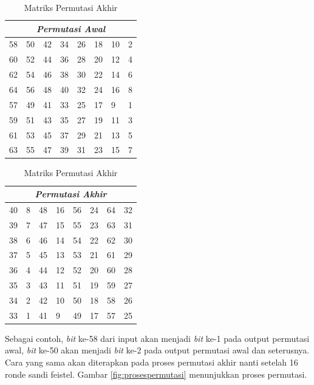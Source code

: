 \begin{table}[H]
	\centering
	\begin{minipage}[H]{.4\textwidth}
		\begin{tabular}{|l|l|l|l|l|l|l|l|}
				\hline
				\multicolumn{8}{|c|}{\textit{Permutasi Awal}} \\
				\hline
				58	&	50	&	42	&	34	&	26	&	18	&	10	&	2	\\ \hline
				60	&	52	&	44	&	36	&	28	&	20	&	12	&	4	\\ \hline
				62	&	54	&	46	&	38	&	30	&	22	&	14	&	6	\\ \hline
				64	&	56	&	48	&	40	&	32	&	24	&	16	&	8	\\ \hline
				57	&	49	&	41	&	33	&	25	&	17	&	9	&	1	\\ \hline
				59	&	51	&	43	&	35	&	27	&	19	&	11	&	3	\\ \hline
				61	&	53	&	45	&	37	&	29	&	21	&	13	&	5	\\ \hline
				63	&	55	&	47	&	39	&	31	&	23	&	15	&	7	\\ \hline
		\end{tabular}
		\caption{Matriks Permutasi Awal}\label{table:awal}
	\end{minipage}\qquad
	\begin{minipage}[H]{.4\textwidth}
		\begin{tabular}{|l|l|l|l|l|l|l|l|}
				\hline
				\multicolumn{8}{|c|}{\textit{Permutasi Akhir}} \\
				\hline
				40	&	8	&	48	&	16	&	56	&	24	&	64	&	32	\\ \hline
				39	&	7	&	47	&	15	&	55	&	23	&	63	&	31	\\ \hline
				38	&	6	&	46	&	14	&	54	&	22	&	62	&	30	\\ \hline
				37	&	5	&	45	&	13	&	53	&	21	&	61	&	29	\\ \hline
				36	&	4	&	44	&	12	&	52	&	20	&	60	&	28	\\ \hline
				35	&	3	&	43	&	11	&	51	&	19	&	59	&	27	\\ \hline
				34	&	2	&	42	&	10	&	50	&	18	&	58	&	26	\\ \hline
				33	&	1	&	41	&	9	&	49	&	17	&	57	&	25	\\ \hline
		\end{tabular}
		\caption{Matriks Permutasi Akhir}\label{table:akhir}
	\end{minipage}\hfill
\end{table}


Sebagai contoh, \textit{bit} ke-58 dari input akan menjadi \textit{bit} ke-1 pada output permutasi awal, \textit{bit} ke-50 akan menjadi \textit{bit} ke-2 pada output permutasi awal dan seterusnya. Cara yang sama akan diterapkan pada proses permutasi akhir nanti setelah 16 ronde sandi feistel. Gambar \ref{fig:prosespermutasi} menunjukkan proses permutasi.

